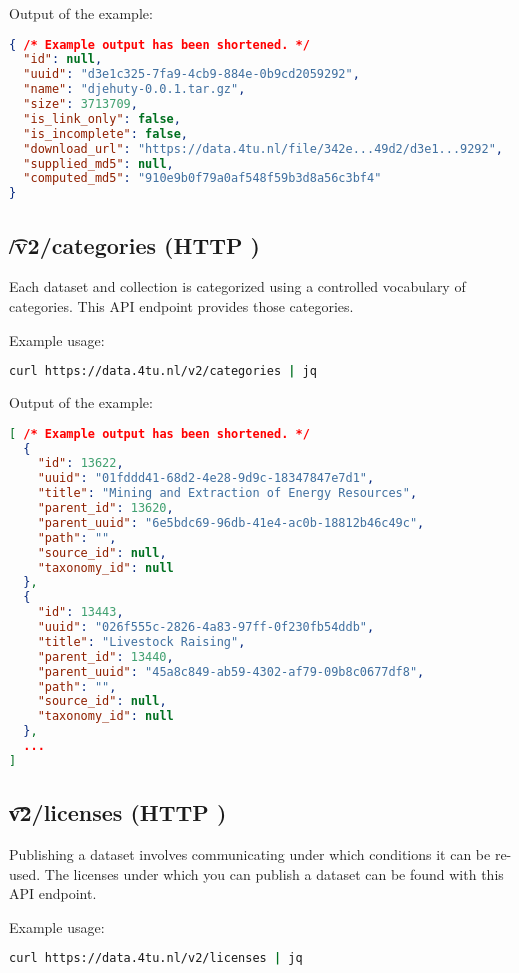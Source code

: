   Output of the example:
\begin{lstlisting}[language=JSON]
{ /* Example output has been shortened. */
  "id": null,
  "uuid": "d3e1c325-7fa9-4cb9-884e-0b9cd2059292",
  "name": "djehuty-0.0.1.tar.gz",
  "size": 3713709,
  "is_link_only": false,
  "is_incomplete": false,
  "download_url": "https://data.4tu.nl/file/342e...49d2/d3e1...9292",
  "supplied_md5": null,
  "computed_md5": "910e9b0f79a0af548f59b3d8a56c3bf4"
}
\end{lstlisting}

\subsection{\t{/v2/categories} (HTTP )}
\label{sec:v2-categories}

  Each dataset and collection is categorized using a controlled vocabulary
  of categories.  This API endpoint provides those categories.

  Example usage:
\begin{lstlisting}[language=bash]
curl https://data.4tu.nl/v2/categories | jq
\end{lstlisting}

  Output of the example:
\begin{lstlisting}[language=JSON]
[ /* Example output has been shortened. */
  {
    "id": 13622,
    "uuid": "01fddd41-68d2-4e28-9d9c-18347847e7d1",
    "title": "Mining and Extraction of Energy Resources",
    "parent_id": 13620,
    "parent_uuid": "6e5bdc69-96db-41e4-ac0b-18812b46c49c",
    "path": "",
    "source_id": null,
    "taxonomy_id": null
  },
  {
    "id": 13443,
    "uuid": "026f555c-2826-4a83-97ff-0f230fb54ddb",
    "title": "Livestock Raising",
    "parent_id": 13440,
    "parent_uuid": "45a8c849-ab59-4302-af79-09b8c0677df8",
    "path": "",
    "source_id": null,
    "taxonomy_id": null
  },
  ...
]
\end{lstlisting}

\subsection{\t{v2/licenses} (HTTP )}
\label{sec:v2-licenses}

  Publishing a dataset involves communicating under which conditions it can be
  re-used.  The licenses under which you can publish a dataset can be found with
  this API endpoint.

  Example usage:
\begin{lstlisting}[language=bash]
curl https://data.4tu.nl/v2/licenses | jq
\end{lstlisting}

